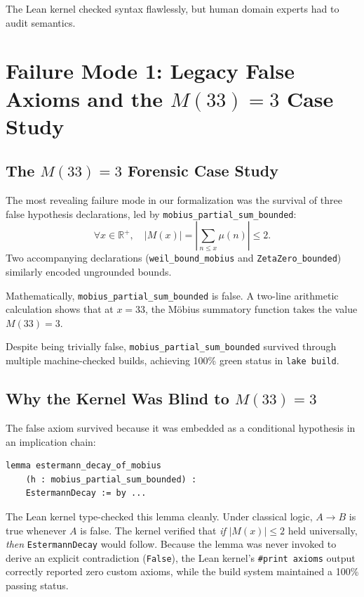 \documentclass[11pt,a4paper]{article}
\theoremstyle{definition}
\theoremstyle{remark}
\begin{document}
The Lean kernel checked syntax flawlessly, but human domain experts had to audit semantics.

\section{Failure Mode 1: Legacy False Axioms and the $M(33)=3$ Case Study}
\label{sec:failure1}

\subsection{The $M(33)=3$ Forensic Case Study}

The most revealing failure mode in our formalization was the survival of three false hypothesis declarations, led by \texttt{mobius\_partial\_sum\_bounded}:
\[
\forall x \in \mathbb{R}^+, \quad |M(x)| = \left| \sum_{n \le x} \mu(n) \right| \le 2.
\]
Two accompanying declarations (\texttt{weil\_bound\_mobius} and \texttt{ZetaZero\_bounded}) similarly encoded ungrounded bounds.

Mathematically, \texttt{mobius\_partial\_sum\_bounded} is false. A two-line arithmetic calculation shows that at $x = 33$, the M\"obius summatory function takes the value $M(33) = 3$. 

Despite being trivially false, \texttt{mobius\_partial\_sum\_bounded} survived through multiple machine-checked builds, achieving 100\% green status in \texttt{lake build}.

\subsection{Why the Kernel Was Blind to $M(33)=3$}

The false axiom survived because it was embedded as a conditional hypothesis in an implication chain:
\begin{verbatim}
lemma estermann_decay_of_mobius 
    (h : mobius_partial_sum_bounded) : 
    EstermannDecay := by ...
\end{verbatim}

The Lean kernel type-checked this lemma cleanly. Under classical logic, $A \to B$ is true whenever $A$ is false. The kernel verified that \emph{if} $|M(x)| \le 2$ held universally, \emph{then} \texttt{EstermannDecay} would follow. Because the lemma was never invoked to derive an explicit contradiction (\texttt{False}), the Lean kernel's \texttt{\#print axioms} output correctly reported zero custom axioms, while the build system maintained a 100\% passing status.
\end{document}
